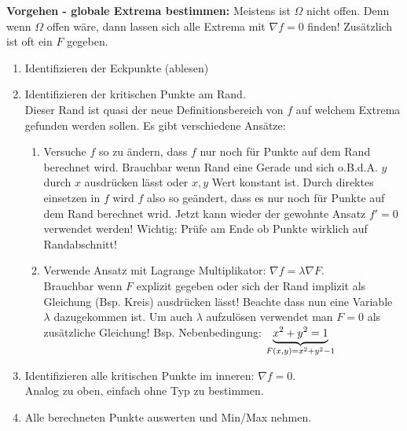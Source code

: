 \textbf{Vorgehen - globale Extrema bestimmen:} 
Meistens ist $\Omega$ nicht offen. Denn wenn $\Omega$ offen wäre, dann lassen sich alle Extrema mit $\nabla f = 0$ finden! Zusätzlich ist oft ein $F$ gegeben.
\begin{enumerate}[leftmargin=0.5cm]
	\item Identifizieren der Eckpunkte (ablesen)

	\item Identifizieren der kritischen Punkte am Rand. \\
	Dieser Rand ist quasi der neue Definitionsbereich von $f$ auf welchem Extrema gefunden werden sollen. Es gibt verschiedene Ansätze:
	\begin{enumerate}[leftmargin=0.3cm]
		\item Versuche $f$ so zu ändern, dass $f$ nur noch für Punkte auf dem Rand berechnet wird. Brauchbar wenn Rand eine Gerade und sich o.B.d.A. $y$ durch $x$ ausdrücken lässt oder $x, y$ Wert konstant ist. Durch direktes einsetzen in $f$ wird $f$ also so geändert, dass es nur noch für Punkte auf dem Rand berechnet wrid. Jetzt kann wieder der gewohnte Ansatz $f' = 0$ verwendet werden! Wichtig: Prüfe am Ende ob Punkte wirklich auf Randabschnitt!

		\item Verwende Ansatz mit Lagrange Multiplikator: $\nabla f = \lambda \nabla F$.\\
		Brauchbar wenn $F$ explizit gegeben oder sich der Rand implizit als Gleichung (Bsp. Kreis) ausdrücken lässt! Beachte dass nun eine Variable $\lambda$ dazugekommen ist. Um auch $\lambda$ aufzulösen verwendet man $F = 0$ als zusätzliche Gleichung! 
		Bsp. Nebenbedingung: $\underset{F(x,y) = x^2 + y^2 - 1}{\underbrace{x^2 + y^2 = 1}}$
 	\end{enumerate}

 	\item Identifizieren alle kritischen Punkte im inneren: $\nabla f = 0$. \\
	Analog zu oben, einfach ohne Typ zu bestimmen.

	\item Alle berechneten Punkte auswerten und Min/Max nehmen.
\end{enumerate}
